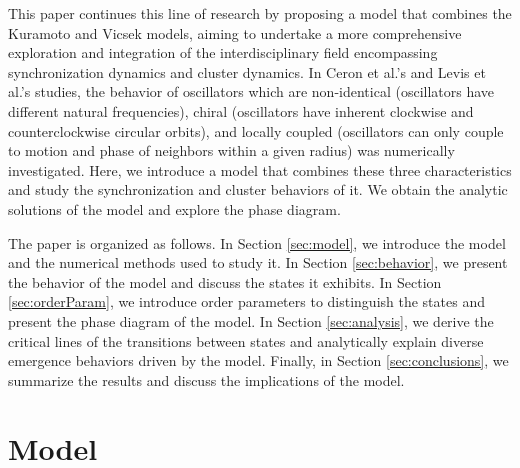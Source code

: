 \documentclass[%
 aip,
 amsmath,amssymb,
 reprint,%
]{revtex4-1}
\begin{document}
This paper continues this line of research by proposing a model that combines the Kuramoto and Vicsek models, aiming to undertake a more comprehensive exploration and integration of the interdisciplinary field encompassing synchronization dynamics and cluster dynamics. In Ceron et al.'s \cite{ceron2023diverse} and Levis et al.'s \cite{levis2019activity} studies, the behavior of oscillators which are non-identical (oscillators have different natural frequencies), chiral
(oscillators have inherent clockwise and counterclockwise circular orbits), and locally coupled (oscillators can only couple to motion and phase of neighbors within a given radius) was numerically investigated. Here, we introduce a model that combines these three characteristics and study the synchronization and cluster behaviors of it. We obtain the analytic solutions of the model and explore the phase diagram. 

The paper is organized as follows. In Section \ref{sec:model}, we introduce the model and the numerical methods used to study it. In Section \ref{sec:behavior}, we present the behavior of the model and discuss the states it exhibits. In Section \ref{sec:orderParam}, we introduce order parameters to distinguish the states and present the phase diagram of the model. In Section \ref{sec:analysis}, we derive the critical lines of the transitions between states and analytically explain diverse emergence behaviors driven by the model. Finally, in Section \ref{sec:conclusions}, we summarize the results and discuss the implications of the model.

\section{\label{sec:model} Model}
\end{document}
